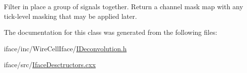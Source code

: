 Filter in place a group of signals together. Return a channel mask map with any tick-\/level masking that may be applied later. 

The documentation for this class was generated from the following files\+:\begin{DoxyCompactItemize}
\item 
iface/inc/\+Wire\+Cell\+Iface/\hyperlink{_i_deconvolution_8h}{I\+Deconvolution.\+h}\item 
iface/src/\hyperlink{_iface_desctructors_8cxx}{Iface\+Desctructors.\+cxx}\end{DoxyCompactItemize}
